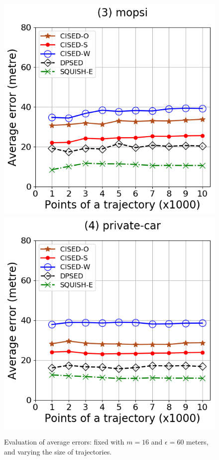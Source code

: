 \begin{figure}[tb!]
	\includegraphics[scale = 0.30]{Figures/Exp-error-size-mopsi.png}
	\includegraphics[scale = 0.30]{Figures/Exp-error-size-private.png}
	\caption{\small Evaluation of average errors: fixed with $m=16$ and $\epsilon=60$ meters, and varying the size of trajectories.}
	\label{fig:ae-size}
\end{figure}



